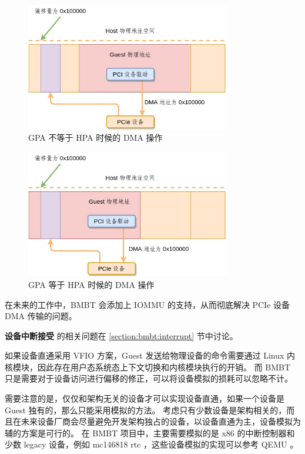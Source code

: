 \begin{figure}[!htbp]
	\centering
	\includegraphics[width=0.8\textwidth]{./images/bmbt-without-iommu.jpg}
	\caption{GPA 不等于 HPA 时候的 DMA 操作}
	\label{fig:bmbt_without_iommu}
\end{figure}

\begin{figure}[!htbp]
	\centering
	\includegraphics[width=0.8\textwidth]{./images/bmbt-without-iommu2.jpg}
	\caption{GPA 等于 HPA 时候的 DMA 操作}
	\label{fig:bmbt_without_iommu2}
\end{figure}

在未来的工作中，BMBT 会添加上 IOMMU 的支持，从而彻底解决 PCIe 设备 DMA 传输的问题。

\textbf{设备中断接受} 的相关问题在 \ref{section:bmbt:interrupt} 节中讨论。

如果设备直通采用 VFIO 方案，Guest 发送给物理设备的命令需要通过 Linux 内核模块，因此存在用户态系统态上下文切换和内核模块执行的开销。
而 BMBT 只是需要对于设备访问进行偏移的修正，可以将设备模拟的损耗可以忽略不计。

需要注意的是，仅仅和架构无关的设备才可以实现设备直通，如果一个设备是 Guest 独有的，那么只能采用模拟的方法。
考虑只有少数设备是架构相关的，而且在未来设备厂商会尽量避免开发架构独占的设备，以设备直通为主，设备模拟为辅的方案是可行的。
在 BMBT 项目中，主要需要模拟的是 x86 的中断控制器和少数 legacy 设备，例如 mc146818 rtc ，这些设备模拟的实现可以参考 QEMU 。

